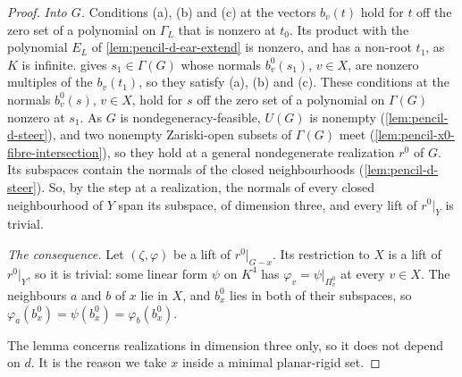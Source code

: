 \begin{proof}
  \emph{Into $G$.} Conditions (a), (b) and (c) at the vectors $b_v(t)$
  hold for $t$ off the zero set of a polynomial on $\Gamma_L$ that is
  nonzero at $t_0$. Its product with the polynomial $E_L$ of
  \cref{lem:pencil-d-ear-extend} is nonzero, and has a non-root $t_1$, as
  $K$ is infinite.  gives $s_1 \in
  \Gamma(G)$ whose normals $b^0_v(s_1)$, $v \in X$, are nonzero multiples
  of the $b_v(t_1)$, so they satisfy (a), (b) and (c). These conditions at
  the normals $b^0_v(s)$, $v \in X$, hold for $s$ off the zero set of a
  polynomial on $\Gamma(G)$ nonzero at $s_1$. As $G$ is
  nondegeneracy-feasible, $U(G)$ is nonempty (\cref{lem:pencil-d-steer}),
  and two nonempty Zariski-open subsets of $\Gamma(G)$ meet
  (\cref{lem:pencil-x0-fibre-intersection}), so they hold at a general
  nondegenerate realization $r^0$ of $G$. Its subspaces contain the
  normals of the closed neighbourhoods (\cref{lem:pencil-d-steer}). So,
  by the step at a realization, the normals of every closed neighbourhood
  of $Y$ span its subspace, of dimension three, and every lift of
  $r^0|_Y$ is trivial.

  \emph{The consequence.} Let $(\zeta, \varphi)$ be a lift of
  $r^0|_{G - x}$. Its restriction to $X$ is a lift of $r^0|_Y$, so it is
  trivial: some linear form $\psi$ on $K^4$ has
  $\varphi_v = \psi|_{\Pi^0_v}$ at every $v \in X$. The neighbours $a$ and
  $b$ of $x$ lie in $X$, and $b^0_x$ lies in both of their subspaces, so
  $\varphi_a(b^0_x) = \psi(b^0_x) = \varphi_b(b^0_x)$.

  The lemma concerns realizations in dimension three only, so it does not
  depend on $d$. It is the reason we take $x$ inside a minimal
  planar-rigid set.
\end{proof}

